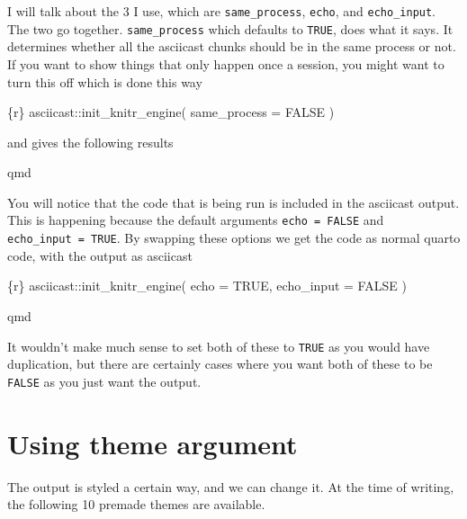 \documentclass[
  letterpaper,
  DIV=11,
  numbers=noendperiod]{scrreprt}
\newenvironment{Shaded}{\begin{snugshade}}{\end{snugshade}}
\newcommand{\InformationTok}[1]{\textcolor[rgb]{0.37,0.37,0.37}{#1}}
\begin{document}
I will talk about the 3 I use, which are \texttt{same\_process},
\texttt{echo}, and \texttt{echo\_input}. The two go together.
\texttt{same\_process} which defaults to \texttt{TRUE}, does what it
says. It determines whether all the asciicast chunks should be in the
same process or not. If you want to show things that only happen once a
session, you might want to turn this off which is done this way

\begin{Shaded}
\begin{Highlighting}[]
\InformationTok{\textasciigrave{}\textasciigrave{}\textasciigrave{}\{r\}}
\InformationTok{asciicast::init\_knitr\_engine(}
\InformationTok{  same\_process = FALSE}
\InformationTok{)}
\InformationTok{\textasciigrave{}\textasciigrave{}\textasciigrave{}}
\end{Highlighting}
\end{Shaded}

and gives the following results

qmd

You will notice that the code that is being run is included in the
asciicast output. This is happening because the default arguments
\texttt{echo\ =\ FALSE} and \texttt{echo\_input\ =\ TRUE}. By swapping
these options we get the code as normal quarto code, with the output as
asciicast

\begin{Shaded}
\begin{Highlighting}[]
\InformationTok{\textasciigrave{}\textasciigrave{}\textasciigrave{}\{r\}}
\InformationTok{asciicast::init\_knitr\_engine(}
\InformationTok{  echo = TRUE,}
\InformationTok{  echo\_input = FALSE}
\InformationTok{)}
\InformationTok{\textasciigrave{}\textasciigrave{}\textasciigrave{}}
\end{Highlighting}
\end{Shaded}

qmd

It wouldn't make much sense to set both of these to \texttt{TRUE} as you
would have duplication, but there are certainly cases where you want
both of these to be \texttt{FALSE} as you just want the output.

\section{Using theme argument}\label{using-theme-argument}

The output is styled a certain way, and we can change it. At the time of
writing, the following 10 premade themes are available.
\end{document}
